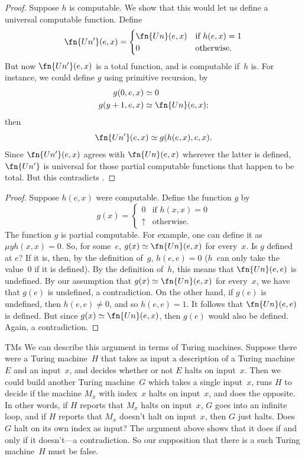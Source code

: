 \documentclass[10pt,a4paper]{article}
\makeatletter
\theoremstyle{plain}
\theoremstyle{definition}
\theoremstyle{remark}
\newenvironment{explain}{}{}
\newcommand{\olref}{\@ifnextchar[{\olref@i}{\olref@final}}
\def\olref@i[#1]{\@ifnextchar[{\olref@ii}{\olref@final}}
\def\olref@ii[#1]{\@ifnextchar[{\olref@iii}{\olref@final}}
\def\olref@iii[#1]{\olref@final}
\def\olref@final#1{\ref{#1}}
\providecommand{\umin}{\mu}
\providecommand{\fundefined}{\mathord{\uparrow}}
\makeatother
\begin{document}
\begin{proof}
Suppose $h$ is computable. We show that this would let us define a
universal computable function. Define
\[
\fn{Un'}(e,x) =
\begin{cases}
\fn{Un}(e,x) & \text{if $h(e,x) = 1$} \\
0 & \text{otherwise.}
\end{cases}
\]
But now $\fn{Un'}(e, x)$ is a total function, and is computable if~$h$
is. For instance, we could define $g$ using primitive recursion, by
\begin{align*}
g(0, e, x) & \simeq 0 \\
g(y+1, e, x) & \simeq \fn{Un}(e,x);
\end{align*}
then
\[
\fn{Un'}(e,x) \simeq g(h(e,x),e,x).
\]
Since $\fn{Un'}(e,x)$ agrees with $\fn{Un}(e,x)$ wherever the latter
is defined, $\fn{Un'}$ is universal for those partial computable
functions that happen to be total. But this contradicts
\olref[nou]{thm:no-univ}.
\end{proof}

\begin{proof}
Suppose $h(e,x)$ were computable. Define the function $g$ by
\[
g(x) =
\begin{cases}
  0                & \text{if $h(x,x) = 0$} \\
  \fundefined & \text{otherwise.}
\end{cases}
\]
The function $g$ is partial computable. For example, one can define it
as $\umin{y}{h(x,x) = 0}$. So, for some~$e$, $g(x) \simeq \fn{Un}(e,
x)$ for every~$x$. Is $g$ defined at $e$?  If it is, then, by the
definition of~$g$, $h(e,e) = 0$ ($h$~can only take the value~$0$ if it
is defined). By the definition of~$h$, this means that $\fn{Un}(e, e)$
is undefined. By our assumption that $g(x) \simeq \fn{Un}(e, x)$
for every~$x$, we have that $g(e)$ is undefined, a contradiction.
On the other hand, if $g(e)$ is undefined, then $h(e,e) \neq 0$, and
so $h(e,e) = 1$. It follows that $\fn{Un}(e, e)$ is defined. But since
$g(x) \simeq \fn{Un}(e, x)$, then $g(e)$ would also be defined. Again,
a contradiction.
\end{proof}

\begin{tagblock}{TMs}
\begin{explain}
We can describe this argument in terms of Turing machines.  Suppose
there were a Turing machine~$H$ that takes as input a description of a
Turing machine~$E$ and an input~$x$, and decides whether or not $E$
halts on input~$x$. Then we could build another Turing machine~$G$
which takes a single input~$x$, runs $H$ to decide if the machine
$M_x$ with index~$x$ halts on input~$x$, and does the opposite. In
other words, if $H$ reports that $M_x$ halts on input~$x$, $G$ goes
into an infinite loop, and if $H$ reports that $M_x$ doesn't halt on
input~$x$, then $G$ just halts. Does $G$ halt on its own index as
input? The argument above shows that it does if and only if it
doesn't---a contradiction. So our supposition that there is a such
Turing machine~$H$ must be false.
\end{explain}
\end{tagblock}
\end{document}
